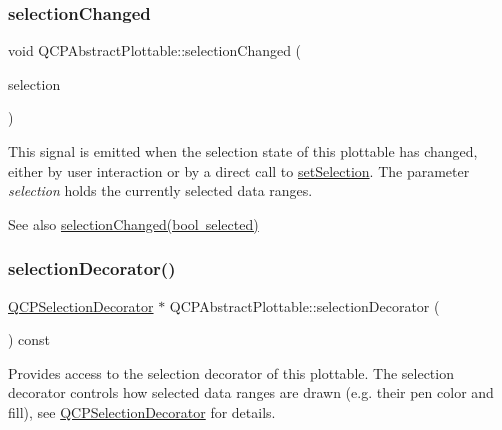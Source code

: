 \subsubsection{\texorpdfstring{selection\+Changed}{selectionChanged}\hspace{0.1cm}{\footnotesize\ttfamily [2/2]}}
{\footnotesize\ttfamily void Q\+C\+P\+Abstract\+Plottable\+::selection\+Changed (\begin{DoxyParamCaption}\item[{const \mbox{\hyperlink{class_q_c_p_data_selection}{Q\+C\+P\+Data\+Selection}} \&}]{selection }\end{DoxyParamCaption})\hspace{0.3cm}{\ttfamily [signal]}}

This signal is emitted when the selection state of this plottable has changed, either by user interaction or by a direct call to \mbox{\hyperlink{class_q_c_p_abstract_plottable_a219bc5403a9d85d3129165ec3f5ae436}{set\+Selection}}. The parameter {\itshape selection} holds the currently selected data ranges.

\begin{DoxySeeAlso}{See also}
\mbox{\hyperlink{class_q_c_p_abstract_plottable_a3af66432b1dca93b28e00e78a8c7c1d9}{selection\+Changed(bool selected)}} 
\end{DoxySeeAlso}
\mbox{\label{class_q_c_p_abstract_plottable_a7861518e47ca0c6a0c386032c2db075e}} 
\subsubsection{\texorpdfstring{selection\+Decorator()}{selectionDecorator()}}
{\footnotesize\ttfamily \mbox{\hyperlink{class_q_c_p_selection_decorator}{Q\+C\+P\+Selection\+Decorator}} $\ast$ Q\+C\+P\+Abstract\+Plottable\+::selection\+Decorator (\begin{DoxyParamCaption}{ }\end{DoxyParamCaption}) const\hspace{0.3cm}{\ttfamily [inline]}}

Provides access to the selection decorator of this plottable. The selection decorator controls how selected data ranges are drawn (e.\+g. their pen color and fill), see \mbox{\hyperlink{class_q_c_p_selection_decorator}{Q\+C\+P\+Selection\+Decorator}} for details.

